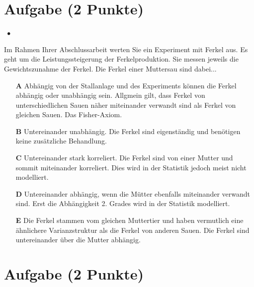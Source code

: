 \documentclass[a4paper, 9pt]{scrartcl}\usepackage[]{graphicx}\usepackage[]{xcolor}
\begin{document}
\section{Aufgabe \hfill (2 Punkte)}

\ifcollection
\begin{flushright}
\tiny\vspace{-2Ex}
\textbf{\examinhaltstart}
\exammodulestatversuch $\;\bullet$
\exammodulebiostat
\vspace{-1Ex}
\end{flushright}
\fi




Im Rahmen Ihrer Abschlussarbeit werten Sie ein Experiment mit Ferkel aus. Es geht um die Leistungssteigerung der Ferkelproduktion. Sie messen jeweils die Gewichtszunahme der Ferkel. Die Ferkel einer Muttersau sind dabei...



\begin{enumerate}
\item [\textbf{A} \msquare] Abhängig von der Stallanlage und des Experiments können die Ferkel abhängig oder unabhängig sein. Allgmein gilt, dass Ferkel von unterschiedlichen Sauen näher miteinander verwandt sind als Ferkel von gleichen Sauen. Das Fisher-Axiom.
\item [\textbf{B} \msquare] Untereinander unabhängig. Die Ferkel sind eigenständig und benötigen keine zusätzliche Behandlung.
\item [\textbf{C} \msquare] Untereinander stark korreliert. Die Ferkel sind von einer Mutter und sommit miteinander korreliert. Dies wird in der Statistik jedoch meist nicht modelliert.
\item [\textbf{D} \msquare] Untereinander abhängig, wenn die Mütter ebenfalls miteinander verwandt sind. Erst die Abhängigkeit 2. Grades wird in der Statistik modelliert.
\item [\textbf{E} \msquare] Die Ferkel stammen vom gleichen Muttertier und haben vermutlich eine ähnlichere Varianzstruktur als die Ferkel von anderen Sauen. Die Ferkel sind untereinander über die Mutter abhängig.
\end{enumerate}

\section{Aufgabe \hfill (2 Punkte)}
\end{document}
